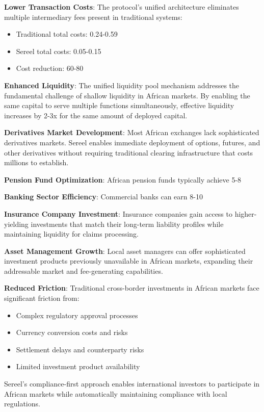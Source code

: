 \documentclass[12pt]{article}
\begin{document}
\textbf{Lower Transaction Costs}: The protocol's unified architecture eliminates multiple intermediary fees present in traditional systems:
\begin{itemize}
	\item Traditional total costs: 0.24-0.59%
	\item Sereel total costs: 0.05-0.15%
	\item Cost reduction: 60-80%

\end{itemize}
\textbf{Enhanced Liquidity}: The unified liquidity pool mechanism addresses the fundamental challenge of shallow liquidity in African markets. By enabling the same capital to serve multiple functions simultaneously, effective liquidity increases by 2-3x for the same amount of deployed capital.

\textbf{Derivatives Market Development}: Most African exchanges lack sophisticated derivatives markets. Sereel enables immediate deployment of options, futures, and other derivatives without requiring traditional clearing infrastructure that costs millions to establish.


\textbf{Pension Fund Optimization}: African pension funds typically achieve 5-8%

\textbf{Banking Sector Efficiency}: Commercial banks can earn 8-10%

\textbf{Insurance Company Investment}: Insurance companies gain access to higher-yielding investments that match their long-term liability profiles while maintaining liquidity for claims processing.

\textbf{Asset Management Growth}: Local asset managers can offer sophisticated investment products previously unavailable in African markets, expanding their addressable market and fee-generating capabilities.


\textbf{Reduced Friction}: Traditional cross-border investments in African markets face significant friction from:
\begin{itemize}
	\item Complex regulatory approval processes
	\item Currency conversion costs and risks
	\item Settlement delays and counterparty risks
	\item Limited investment product availability

\end{itemize}
Sereel's compliance-first approach enables international investors to participate in African markets while automatically maintaining compliance with local regulations.
\end{document}
